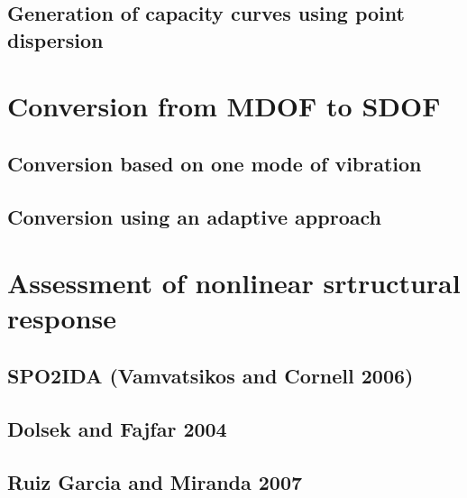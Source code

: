 		\subsection{Generation of capacity curves using point dispersion}
		\label{subsec:dispersion}
		
			
	\section{Conversion from MDOF to SDOF}
	\label{sec:mdof_to_sdof}
	
	
		\subsection{Conversion based on one mode of vibration}
		\label{subsec:one_mode}
		
		
		\subsection{Conversion using an adaptive approach}
		\label{subsec:adaptive}
		
		
	\section{Assessment of nonlinear srtructural response}
	\label{sec:nonlinear_response}
	
			
		\subsection{SPO2IDA (Vamvatsikos and Cornell 2006)}
		\label{subsec:SPO2IDA}
		
		
		\subsection{Dolsek and Fajfar 2004}
		\label{subsec:DolsekFajfar}
		

		\subsection{Ruiz Garcia and Miranda 2007}
		\label{subsec:RuizGarciaMiranda}
		
		
